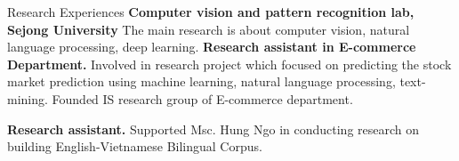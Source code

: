 \begin{rubric}{Research Experiences}
\entry*[03/2016 -- Present]%
	\textbf{Computer vision and pattern recognition lab, Sejong University} The main research is about computer vision, natural language processing, deep learning.
%
%
\entry*[10/2014 -- 06/2016]%
	\textbf{Research assistant in E-commerce Department.} Involved in research project which focused on predicting the stock market prediction using machine learning, natural language processing, text-mining. Founded IS research group of E-commerce department.

\entry*[10/2011 -- 10/2012]%
	\textbf{Research assistant.} Supported Msc. Hung Ngo in conducting research on building English-Vietnamese Bilingual Corpus.
    
\end{rubric}